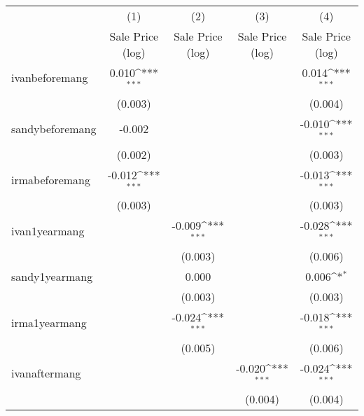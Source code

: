 {
\def\sym#1{\ifmmode^{#1}\else\(^{#1}\)\fi}
\begin{tabular}{l*{4}{c}}
\hline\hline
                    &\multicolumn{1}{c}{(1)}&\multicolumn{1}{c}{(2)}&\multicolumn{1}{c}{(3)}&\multicolumn{1}{c}{(4)}\\
                    &\multicolumn{1}{c}{Sale Price (log)}&\multicolumn{1}{c}{Sale Price (log)}&\multicolumn{1}{c}{Sale Price (log)}&\multicolumn{1}{c}{Sale Price (log)}\\
\hline
ivanbeforemang      &       0.010\sym{***}&                     &                     &       0.014\sym{***}\\
                    &     (0.003)         &                     &                     &     (0.004)         \\
[1em]
sandybeforemang     &      -0.002         &                     &                     &      -0.010\sym{***}\\
                    &     (0.002)         &                     &                     &     (0.003)         \\
[1em]
irmabeforemang      &      -0.012\sym{***}&                     &                     &      -0.013\sym{***}\\
                    &     (0.003)         &                     &                     &     (0.003)         \\
[1em]
ivan1yearmang       &                     &      -0.009\sym{***}&                     &      -0.028\sym{***}\\
                    &                     &     (0.003)         &                     &     (0.006)         \\
[1em]
sandy1yearmang      &                     &       0.000         &                     &       0.006\sym{*}  \\
                    &                     &     (0.003)         &                     &     (0.003)         \\
[1em]
irma1yearmang       &                     &      -0.024\sym{***}&                     &      -0.018\sym{***}\\
                    &                     &     (0.005)         &                     &     (0.006)         \\
[1em]
ivanaftermang       &                     &                     &      -0.020\sym{***}&      -0.024\sym{***}\\
                    &                     &                     &     (0.004)         &     (0.004)         \\

\end{tabular}}
